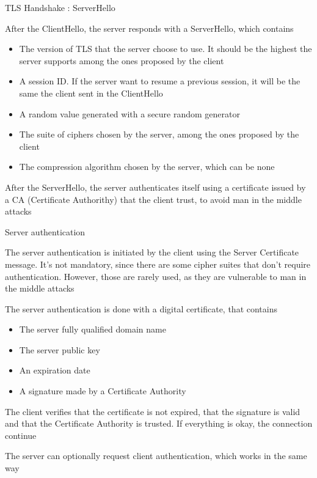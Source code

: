 \begin{frame}{TLS Handshake : ServerHello}
	
After the ClientHello, the server responds with a ServerHello, which contains 

\begin{itemize}
	\item The version of TLS that the server choose to use. It should be the highest the server supports among the ones proposed by the client
	\item A session ID. If the server want to resume a previous session, it will be the same the client sent in the ClientHello
	\item A random value generated with a secure random generator
	\item The suite of ciphers chosen by the server, among the ones proposed by the client
	\item The compression algorithm chosen by the server, which can be none
\end{itemize}

After the ServerHello, the server authenticates itself using a certificate issued by a CA (Certificate Authorithy) that the client trust, to avoid man in the middle attacks

\end{frame}


\begin{frame}{Server authentication}
	
The server authentication is initiated by the client using the Server Certificate message. It's not mandatory, since there are some cipher suites that don't require authentication.
However, those are rarely used, as they are vulnerable to man in the middle attacks

The server authentication is done with a digital certificate, that contains

\begin{itemize}
	\item The server fully qualified domain name
	\item The server public key
	\item An expiration date
	\item A signature made by a Certificate Authority
\end{itemize}

The client verifies that the certificate is not expired, that the signature is valid and that the Certificate Authority is trusted.
If everything is okay, the connection continue

The server can optionally request client authentication, which works in the same way

	
\end{frame}

